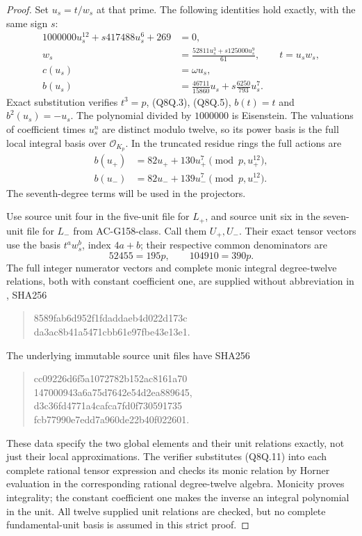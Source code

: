 \begin{proof}
Set $u_s=t/w_s$ at that prime.
The following identities hold exactly, with the same sign $s$:
\[
 \begin{aligned}
 1000000u_s^{12}+s417488u_s^6+269&=0,\\
 w_s&=\frac{52811u_s^3+s125000u_s^9}{61},\qquad t=u_sw_s,\\
 c(u_s)&=\omega u_s,\\
 b(u_s)&=\frac{46711}{15860}u_s+s\frac{6250}{793}u_s^7.
 \end{aligned}
 \tag{Q8Q.11}
\]
Exact substitution verifies $t^3=p$, (Q8Q.3), (Q8Q.5),
$b(t)=t$ and $b^2(u_s)=-u_s$.
The polynomial divided by $1000000$ is Eisenstein.
The valuations of coefficient times $u_s^n$ are distinct modulo
twelve, so its power basis is the full local integral basis over
$\mathcal O_{K_p}$.
In the truncated residue rings the full actions are
\[
 \begin{aligned}
 b(u_+)&=82u_++130u_+^7\pmod{p,u_+^{12}},\\
 b(u_-)&=82u_-+139u_-^7\pmod{p,u_-^{12}}.
 \end{aligned}
 \tag{Q8Q.12}
\]
The seventh-degree terms will be used in the projectors.

Use source unit four in the five-unit file for $L_+$, and source
unit six in the seven-unit file for $L_-$ from AC-G158-class.
Call them $U_+,U_-$.
Their exact tensor vectors use the basis $t^aw_s^b$, index $4a+b$;
their respective common denominators are
\[
                            52455=195p,\qquad104910=390p.
 \tag{Q8Q.13}
\]
The full integer numerator vectors and complete monic integral
degree-twelve relations, both with constant coefficient one,
are supplied without abbreviation in
, SHA256
\begin{quote}\ttfamily\small
8589fab6d952f1fdaddaeb4d022d173c\\
da3ac8b41a5471cbb61e97fbe43e13e1.
\end{quote}
The underlying immutable source unit files have SHA256
\begin{quote}\ttfamily\small
cc09226d6f5a1072782b152ac8161a70\\
147000943a6a75d7642e54d2ea889645,\\[2pt]
d3c36fd4771a4cafca7fd0f730591735\\
fcb77990e7edd7a960de22b40f022601.
\end{quote}
These data specify the two global elements and their unit
relations exactly, not just their local approximations.
The verifier substitutes (Q8Q.11) into each complete rational
tensor expression and checks its monic relation by Horner
evaluation in the corresponding rational degree-twelve algebra.
Monicity proves integrality; the constant coefficient one makes
the inverse an integral polynomial in the unit.
All twelve supplied unit relations are checked, but no complete
fundamental-unit basis is assumed in this strict proof.


\end{proof}
